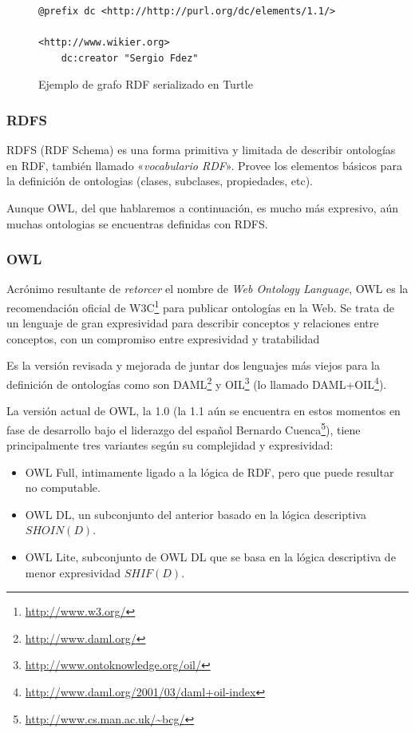 \begin{figure}[H]
\lstset{language=XML}
\begin{lstlisting}
@prefix dc <http://http://purl.org/dc/elements/1.1/>

<http://www.wikier.org> 
	dc:creator "Sergio Fdez"
\end{lstlisting}
\caption{Ejemplo de grafo RDF serializado en Turtle}
\label{fig:ejemplo.rdfturtle}
\end{figure}

\subsubsection{RDFS}

RDFS\cite{RDFS} (RDF Schema) es una forma primitiva y limitada de describir 
ontologías en RDF, también llamado «\emph{vocabulario RDF}». Provee los elementos
básicos para la definición de ontologias (clases, subclases, propiedades, etc).

Aunque OWL, del que hablaremos a continuación, es mucho más expresivo, aún muchas
ontologias se encuentras definidas con RDFS.

\subsubsection{OWL}

Acrónimo resultante de \emph{retorcer} el nombre de 
\emph{Web Ontology Language}, OWL\cite{OWL} es la recomendación 
oficial de W3C\footnote{\url{http://www.w3.org/}} para publicar ontologías en 
la Web. Se trata de un lenguaje de gran expresividad para describir conceptos 
y relaciones entre conceptos, con un compromiso entre expresividad y tratabilidad

Es la versión revisada y mejorada de juntar dos lenguajes más viejos para la 
definición de ontologías como son DAML\footnote{\url{http://www.daml.org/}} y 
OIL\footnote{\url{http://www.ontoknowledge.org/oil/}} (lo llamado
DAML+OIL\footnote{\url{http://www.daml.org/2001/03/daml+oil-index}}).

La versión actual de OWL, la 1.0 (la 1.1 aún se encuentra en estos momentos en 
fase de desarrollo bajo el liderazgo del español Bernardo 
Cuenca\footnote{\url{http://www.cs.man.ac.uk/~bcg/}}), tiene principalmente 
tres variantes según su complejidad y expresividad:

\begin{itemize}
  \item OWL Full, intimamente ligado a la lógica de RDF, pero que puede resultar
	no computable.
  \item OWL DL, un subconjunto del anterior basado en la lógica descriptiva 
	${SHOIN} (D)$.
  \item OWL Lite, subconjunto de OWL DL que se basa en la lógica descriptiva 
	de menor expresividad ${SHIF} (D)$.
\end{itemize}

